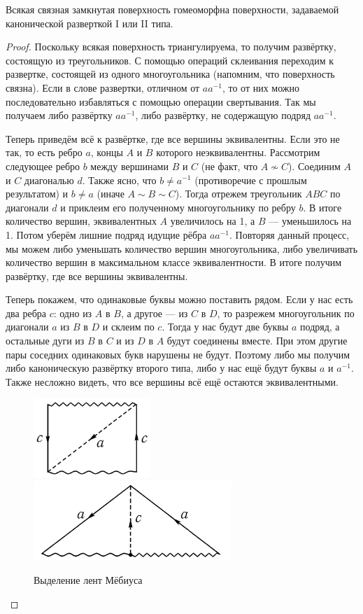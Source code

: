 \documentclass[12pt,a4paper]{article}
\begin{document}
    \begin{theorem}
        Всякая связная замкнутая поверхность гомеоморфна поверхности, задаваемой канонической разверткой I или II типа.
    \end{theorem}

    \begin{proof}
        Поскольку всякая поверхность триангулируема, то получим развёртку, состоящую из треугольников. С помощью операций склеивания переходим к развертке, состоящей из одного многоугольника (напомним, что поверхность связна). Если в слове развертки, отличном от $aa^{-1}$, то от них можно последовательно избавляться с помощью операции свертывания. Так мы получаем либо развёртку $aa^{-1}$, либо развёртку, не содержащую подряд $aa^{-1}$.

        Теперь приведём всё к развёртке, где все вершины эквивалентны. Если это не так, то есть ребро $a$, концы $A$ и $B$ которого неэквивалентны. Рассмотрим следующее ребро $b$ между вершинами $B$ и $C$ (не факт, что $A \nsim C$). Соединим $A$ и $C$ диагональю $d$. Также ясно, что $b \neq a^{-1}$ (противоречие с прошлым результатом) и $b \neq a$ (иначе $A \sim B \sim C$). Тогда отрежем треугольник $ABC$ по диагонали $d$ и приклеим его полученному многоугольнику по ребру $b$. В итоге количество вершин, эквивалентных $A$ увеличилось на 1, а $B$ --- уменьшилось на 1. Потом уберём лишние подряд идущие рёбра $aa^{-1}$. Повторяя данный процесс, мы можем либо уменьшать количество вершин многоугольника, либо увеличивать количество вершин в максимальном классе эквивалентности. В итоге получим развёртку, где все вершины эквивалентны.

        Теперь покажем, что одинаковые буквы можно поставить рядом. Если у нас есть два ребра $c$: одно из $A$ в $B$, а другое --- из $C$ в $D$, то разрежем многоугольник по диагонали $a$ из $B$ в $D$ и склеим по $c$. Тогда у нас будут две буквы $a$ подряд, а остальные дуги из $B$ в $C$ и из $D$ в $A$ будут соединены вместе. При этом другие пары соседних одинаковых букв нарушены не будут. Поэтому либо мы получим либо каноническую развёртку второго типа, либо у нас ещё будут буквы $a$ и $a^{-1}$. Также несложно видеть, что все вершины всё ещё остаются эквивалентными.
        \begin{figure}[h]
            \centering
            \includegraphics[height=3cm]{GaT-1.png}
            \includegraphics[height=3cm]{GaT-2.png}
            \caption{Выделение лент Мёбиуса}
            \label{surface_typisation_picture_4}
        \end{figure}


\end{proof}
\end{document}
